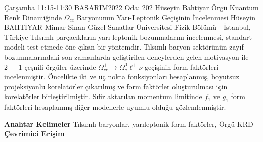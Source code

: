 
    \begin{abstract_basarim}
    {Çarşamba 11:15-11:30}
    {BASARIM2022}
    {Oda: 202}
    {Hüseyin Bahtiyar}
    {Örgü Kuantum Renk Dinamiğinde $\Omega_{c c}$ Baryonunun Yarı-Leptonik Geçişinin İncelenmesi}
    {%
    Hüseyin BAHTİYAR}
    {%
    }
    {%
    Mimar Sinan Güzel Sanatlar Üniversitesi Fizik Bölümü - İstanbul, Türkiye}
    Tılsımlı parçacıkların yarı leptonik bozunmalarını incelenmesi, standart modeli test etmede öne çıkan bir yöntemdir. Tılsımlı baryon sektörünün zayıf bozunmalarındaki son zamanlarda geliştirilen deneylerden gelen motivasyon ile $2+$ 1 çeşnili örgüler üzerinde $\Omega_{c c}^{+} \rightarrow \Omega_{c}^{0} \ell^{+} \nu$ geçişinin form faktörleri incelenmiştir. Öncelikte iki ve üç nokta fonksiyonları hesaplanmış, boyutsuz projeksiyonlu korelatörler çıkarılmış ve form faktörler oluşturulması için korelatörler birleştirilmiştir. Sıfir aktarılan momentum limitinde $f_{1}$ ve $g_{1}$ form faktörleri hesaplanmış diğer modellerle uyumlu olduğu gözlemlenmiştir. 
    
            \textbf{Anahtar Kelimeler} \newline{}Tılsımlı baryonlar, yarıleptonik form faktörler, Örgü KRD
     \newline\newline\noindent \href{https://drive.google.com/file/d/1KmMrXC9UrNVhbc6MjvkIP_cQzeTWIYNI/view?usp=drivesdk}{\bfseries Çevrimici Erişim}
    \end{abstract_basarim}
    